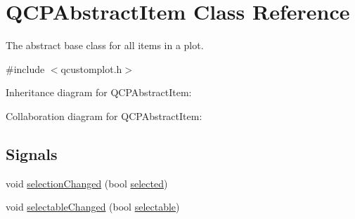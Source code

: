 \hypertarget{class_q_c_p_abstract_item}{}\section{Q\+C\+P\+Abstract\+Item Class Reference}
\label{class_q_c_p_abstract_item}


The abstract base class for all items in a plot.  




{\ttfamily \#include $<$qcustomplot.\+h$>$}



Inheritance diagram for Q\+C\+P\+Abstract\+Item\+:


Collaboration diagram for Q\+C\+P\+Abstract\+Item\+:
\subsection*{Signals}
\begin{DoxyCompactItemize}
\item 
void \hyperlink{class_q_c_p_abstract_item_aa5cffb034fc65dbb91c77e02c1c14251}{selection\+Changed} (bool \hyperlink{class_q_c_p_abstract_item_aa069fba320a13639f119f82ad29ead96}{selected})
\item 
void \hyperlink{class_q_c_p_abstract_item_a5b266c11aac61cb511901f3911dac2a3}{selectable\+Changed} (bool \hyperlink{class_q_c_p_abstract_item_ae29aa489767352b40c4aaa7ea50c5582}{selectable})
\end{DoxyCompactItemize}
